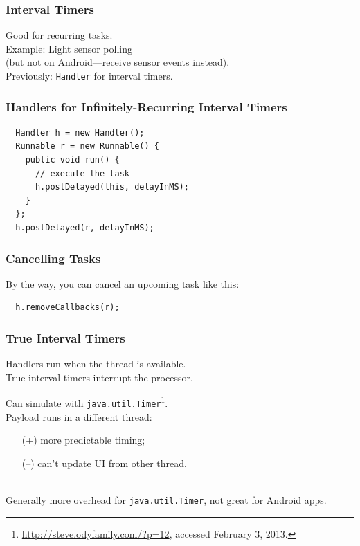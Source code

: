 \begin{frame}
\frametitle{Interval Timers}

\begin{changemargin}{1cm}
\large

Good for recurring tasks.\\[1em]

Example: Light sensor polling\\
 (but not on Android---receive sensor events instead).\\[1em]

Previously: {\tt Handler} for interval timers.

\end{changemargin}

\end{frame}

\begin{frame}[fragile]
\frametitle{Handlers for Infinitely-Recurring Interval Timers}

\begin{lstlisting}
  Handler h = new Handler();
  Runnable r = new Runnable() {
    public void run() {
      // execute the task
      h.postDelayed(this, delayInMS);
    }
  };
  h.postDelayed(r, delayInMS);
\end{lstlisting}

\end{frame}

\begin{frame}[fragile]
\frametitle{Cancelling Tasks}

\begin{changemargin}{1cm}
By the way, you can cancel an upcoming task like this:
\begin{lstlisting}
  h.removeCallbacks(r);
\end{lstlisting}
\end{changemargin}
\end{frame}

\begin{frame}
\frametitle{True Interval Timers}

\large
\begin{changemargin}{1cm}
Handlers run when the thread is available.\\[1em]

True interval timers interrupt the processor.

Can simulate with {\tt java.util.Timer}\footnote{\url{http://steve.odyfamily.com/?p=12}, accessed
  February 3, 2013.}. \\[1em]

Payload runs in a different thread:
\begin{itemize}
\item[(+)] more predictable timing;
\item[(--)] can't update UI from other thread.
\end{itemize}
~\\
Generally more overhead for {\tt java.util.Timer}, not great for Android apps.
\end{changemargin}
\end{frame}

